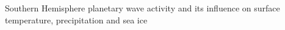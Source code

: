 Southern Hemisphere planetary wave activity and its influence on surface temperature, precipitation and sea ice